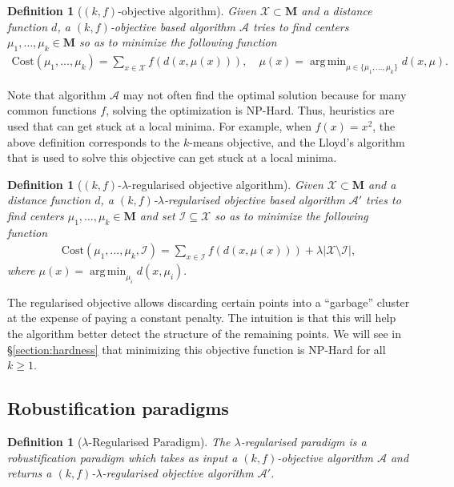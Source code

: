 \documentclass[12pt]{article}
\newcommand{\mc}{\mathcal}
\newcommand{\mb}{\mathbf}
\DeclareMathOperator*{\argmin}{arg\,min}
\newtheorem{definition}[theorem]{Definition}
\begin{document}
\begin{definition}[$(k, f)$-objective algorithm] Given $\mc X\subset \mb M$ and a distance function $d$, a $(k, f)$-objective based algorithm $\mc A$ tries to find centers $\mu_1, \ldots, \mu_k \in \mb M$ so as to minimize the following function
\begin{align}
\label{eqn:kfObjectiveAlg}
\text{Cost}(\mu_1, \ldots, \mu_k) = \sum_{x\in \mc X} f(d(x, \mu(x))), \quad \mu(x) = \argmin_{\mu \in \{\mu_1, \ldots, \mu_k\}} d(x, \mu).
\end{align}
\end{definition}
Note that algorithm $\mc A$ may not often find the optimal solution because for many common functions $f$, solving the optimization is NP-Hard. Thus, heuristics are used that can get stuck at a local minima. For example, when $f(x) = x^2$, the above definition corresponds to the $k$-means objective, and the Lloyd's algorithm that is used to solve this objective can get stuck at a local minima. 

\begin{definition}[$(k, f)$-$\lambda$-regularised objective algorithm] Given $\mc X\subset \mb M$ and a distance function $d$, a $(k, f)$-$\lambda$-regularised objective based algorithm $\mc A'$ tries to find centers $\mu_1, \ldots, \mu_k \in \mb M$ and set $\mc I\subseteq \mc X$ so as to minimize the following function
\begin{align}
\label{eqn:kfObjectiveAlg}
\text{Cost}(\mu_1, \ldots, \mu_k, \mc I) = \sum_{x\in \mc I} f(d(x, \mu(x))) + \lambda |\mc X \setminus \mc I|,
\end{align}
where $\mu(x) = \argmin_{\mu_i} d(x, \mu_i).$
\end{definition}

The regularised objective allows discarding certain points into a ``garbage'' cluster at the expense of paying a constant penalty. The intuition is that this will help the algorithm better detect the structure of the remaining points. We will see in \S \ref{section:hardness} that minimizing this objective function is NP-Hard for all $k \ge 1$.

\subsection{Robustification paradigms}
\begin{definition}[$\lambda$-Regularised Paradigm] The $\lambda$-regularised paradigm is a robustification paradigm which takes as input a $(k, f)$-objective algorithm $\mc A$ and returns a $(k, f)$-$\lambda$-regularised objective algorithm $\mc A'$.  
\end{definition}
\end{document}
